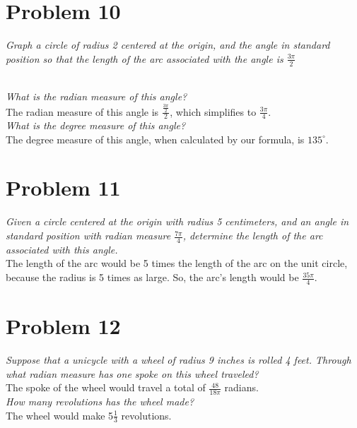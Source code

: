 \documentclass[11pt]{article} %
\newcommand\tab[1][1cm]{\hspace*{#1}}
\begin{document}
\section{Problem 10}
\textit{Graph a circle of radius 2 centered at the origin, and the angle in standard position so that the length of the arc associated with the angle is $\frac{3\pi}{2}$}
\\
\\
\textit{What is the radian measure of this angle?}\\
\tab The radian measure of this angle is $\frac{\frac{3\pi}{2}}{2}$, which simplifies to $\frac{3\pi}{4}$. \\
\textit{What is the degree measure of this angle?}\\
\tab The degree measure of this angle, when calculated by our formula, is $135^{\circ}$.

\section{Problem 11}
\textit{Given a circle centered at the origin with radius 5 centimeters, and an angle in standard position with radian measure $\frac{7\pi}{4}$, determine the length of the arc associated with this angle.} 
\\ \tab The length of the arc would be 5 times the length of the arc on the unit circle, because the radius is 5 times as large. So, the arc's length would be $\frac{35\pi}{4}$. 

\section{Problem 12}
\textit{Suppose that a unicycle with a wheel of radius 9 inches is rolled 4 feet. Through what radian measure has one spoke on this wheel traveled? }\\
\tab The spoke of the wheel would travel a total of $\frac{48}{18\pi}$ radians. 
\\ \textit{How many revolutions has the wheel made?} \\
\tab The wheel would make 5$\frac{1}{3}$ revolutions. 
\end{document}
